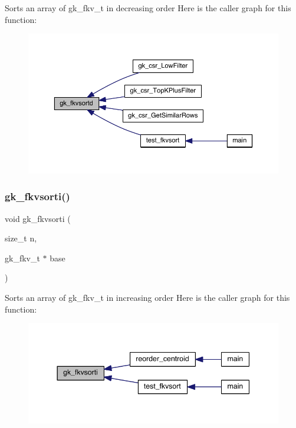 Sorts an array of gk\+\_\+fkv\+\_\+t in decreasing order Here is the caller graph for this function\+:\nopagebreak
\begin{figure}[H]
\begin{center}
\leavevmode
\includegraphics[width=350pt]{a00077_aa28cb87d9cb87860a5b1e23a94d7bba8_icgraph}
\end{center}
\end{figure}
\mbox{\label{a00077_a1d741ae5e6fbe9aeedc02250d5f6fc83}} 
\subsubsection{\texorpdfstring{gk\+\_\+fkvsorti()}{gk\_fkvsorti()}}
{\footnotesize\ttfamily void gk\+\_\+fkvsorti (\begin{DoxyParamCaption}\item[{size\+\_\+t}]{n,  }\item[{gk\+\_\+fkv\+\_\+t $\ast$}]{base }\end{DoxyParamCaption})}

Sorts an array of gk\+\_\+fkv\+\_\+t in increasing order Here is the caller graph for this function\+:\nopagebreak
\begin{figure}[H]
\begin{center}
\leavevmode
\includegraphics[width=344pt]{a00077_a1d741ae5e6fbe9aeedc02250d5f6fc83_icgraph}
\end{center}
\end{figure}
\mbox{\label{a00077_a9060bdb1b8b02be33d32ad59d55b8adb}} 
